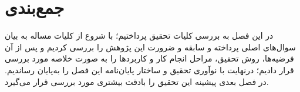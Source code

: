 \section{جمع‌بندی}
\label{ch1.X}

در این فصل به بررسی کلیات تحقیق پرداختیم؛ با شروع از کلیات مساله به بیان سوال‌های اصلی پرداخته و سابقه و ضرورت این پژوهش را بررسی کردیم و پس از آن فرضیه‌ها، روش تحقیق، مراحل انجام کار و کاربردها را به صورت خلاصه مورد بررسی قرار دادیم؛ درنهایت با نوآوری تحقیق و ساختار پایان‌نامه این فصل را به‌پایان رساندیم. در فصل بعدی پیشینه این تحقیق را بادقت بیشتری مورد بررسی قرار می‌گیرد.
